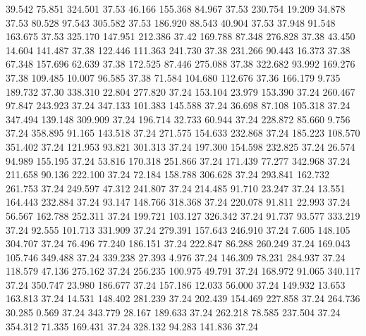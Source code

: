   39.542   75.851  324.501        37.53
  46.166  155.368   84.967        37.53
 230.754   19.209   34.878        37.53
  80.528   97.543  305.582        37.53
 186.920   88.543   40.904        37.53
  37.948   91.548  163.675        37.53
 325.170  147.951  212.386        37.42
 169.788   87.348  276.828        37.38
  43.450   14.604  141.487        37.38
 122.446  111.363  241.730        37.38
 231.266   90.443   16.373        37.38
  67.348  157.696   62.639        37.38
 172.525   87.446  275.088        37.38
 322.682   93.992  169.276        37.38
 109.485   10.007   96.585        37.38
  71.584  104.680  112.676        37.36
 166.179    9.735  189.732        37.30
 338.310   22.804  277.820        37.24
 153.104   23.979  153.390        37.24
 260.467   97.847  243.923        37.24
 347.133  101.383  145.588        37.24
  36.698   87.108  105.318        37.24
 347.494  139.148  309.909        37.24
 196.714   32.733   60.944        37.24
 228.872   85.660    9.756        37.24
 358.895   91.165  143.518        37.24
 271.575  154.633  232.868        37.24
 185.223  108.570  351.402        37.24
 121.953   93.821  301.313        37.24
 197.300  154.598  232.825        37.24
  26.574   94.989  155.195        37.24
  53.816  170.318  251.866        37.24
 171.439   77.277  342.968        37.24
 211.658   90.136  222.100        37.24
  72.184  158.788  306.628        37.24
 293.841  162.732  261.753        37.24
 249.597   47.312  241.807        37.24
 214.485   91.710   23.247        37.24
  13.551  164.443  232.884        37.24
  93.147  148.766  318.368        37.24
 220.078   91.811   22.993        37.24
  56.567  162.788  252.311        37.24
 199.721  103.127  326.342        37.24
  91.737   93.577  333.219        37.24
  92.555  101.713  331.909        37.24
 279.391  157.643  246.910        37.24
   7.605  148.105  304.707        37.24
  76.496   77.240  186.151        37.24
 222.847   86.288  260.249        37.24
 169.043  105.746  349.488        37.24
 339.238   27.393    4.976        37.24
 146.309   78.231  284.937        37.24
 118.579   47.136  275.162        37.24
 256.235  100.975   49.791        37.24
 168.972   91.065  340.117        37.24
 350.747   23.980  186.677        37.24
 157.186   12.033   56.000        37.24
 149.932   13.653  163.813        37.24
  14.531  148.402  281.239        37.24
 202.439  154.469  227.858        37.24
 264.736   30.285    0.569        37.24
 343.779   28.167  189.633        37.24
 262.218   78.585  237.504        37.24
 354.312   71.335  169.431        37.24
 328.132   94.283  141.836        37.24
